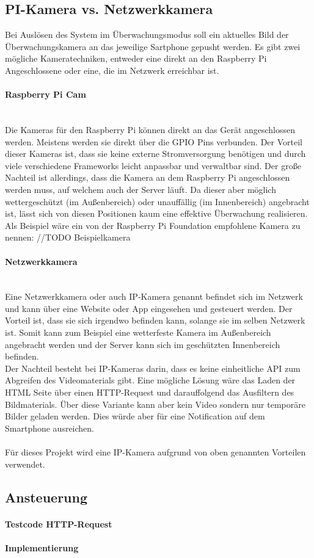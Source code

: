 \subsection{PI-Kamera vs. Netzwerkkamera}
Bei Auslösen des System im Überwachungsmodus soll ein aktuelles Bild der Überwachungskamera an das jeweilige Sartphone gepusht werden. Es gibt zwei mögliche Kameratechniken, entweder eine direkt an den Raspberry Pi Angeschlossene oder eine, die im Netzwerk erreichbar ist. 
\paragraph{Raspberry Pi Cam} \\
Die Kameras für den Raspberry Pi können direkt an das Gerät angeschlossen werden. Meistens werden sie direkt über die GPIO Pins verbunden. Der Vorteil dieser Kameras ist, dass sie keine externe Stromversorgung benötigen und durch viele verschiedene Frameworks leicht anpassbar und verwaltbar sind. Der große Nachteil ist allerdings, dass die Kamera an dem Raspberry Pi angeschlossen werden muss, auf welchem auch der Server läuft. Da dieser aber möglich wettergeschützt (im Außenbereich) oder unauffällig (im Innenbereich) angebracht ist, lässt sich von diesen Positionen kaum eine effektive Überwachung realisieren. \\
Als Beispiel wäre ein von der Raspberry Pi Foundation empfohlene Kamera zu nennen: //TODO Beispielkamera
\paragraph{Netzwerkkamera} \\
Eine Netzwerkkamera oder auch IP-Kamera genannt befindet sich im Netzwerk und kann über eine Website oder App eingesehen und gesteuert werden. Der Vorteil ist, dass sie sich irgendwo befinden kann, solange sie im selben Netzwerk ist. Somit kann zum Beispiel eine wetterfeste Kamera im Außenbereich angebracht werden und der Server kann sich im geschützten Innenbereich befinden. \\
Der Nachteil besteht bei IP-Kameras darin, dass es keine einheitliche API zum Abgreifen des Videomaterials gibt. Eine mögliche Lösung wäre das Laden der HTML Seite über einen HTTP-Request und darauffolgend das Ausfiltern des Bildmaterials. Über diese Variante kann aber kein Video sondern nur temporäre Bilder geladen werden. Dies würde aber für eine Notification auf dem Smartphone ausreichen. \\\\
Für dieses Projekt wird eine IP-Kamera aufgrund von oben genannten Vorteilen verwendet.
\subsection{Ansteuerung}
\paragraph{Testcode HTTP-Request}
\paragraph{Implementierung}

